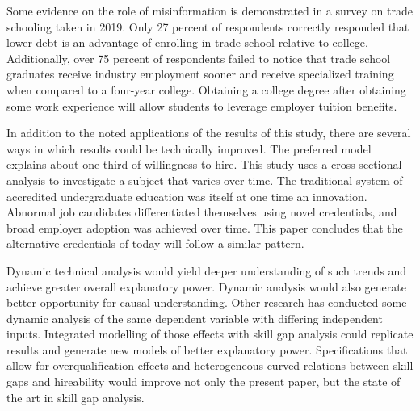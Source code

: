 \documentclass[review]{elsarticle}
\begin{document}
Some evidence on the role of misinformation is demonstrated in a survey on trade schooling taken in 2019\cite{arabia_2019}.
Only 27 percent of respondents correctly responded that lower debt is an advantage of enrolling in trade school relative to college.
Additionally, over 75 percent of respondents failed to notice that trade school graduates receive industry employment sooner
and receive specialized training when compared to a four-year college.
Obtaining a college degree after obtaining some work experience will allow students to leverage employer tuition benefits.


In addition to the noted applications of the results of this study, there are several ways in which results could be technically improved.
The preferred model explains about one third of willingness to hire.
This study uses a cross-sectional analysis to investigate a subject that varies over time.
The traditional system of accredited undergraduate education was itself at one time an innovation.
Abnormal job candidates differentiated themselves using novel credentials, and broad employer adoption was achieved over time.
This paper concludes that the alternative credentials of today will follow a similar pattern.

Dynamic technical analysis would yield deeper understanding of such trends and achieve greater overall explanatory power.
Dynamic analysis would also generate better opportunity for causal understanding.
Other research has conducted some dynamic analysis of the same dependent variable
with differing independent inputs\cite{vandivier2020preliminary}.
Integrated modelling of those effects with skill gap analysis could replicate results and generate new models of better explanatory power.
Specifications that allow for overqualification effects and heterogeneous curved relations between skill gaps and hireability would improve not only the present paper,
but the state of the art in skill gap analysis.
\end{document}
